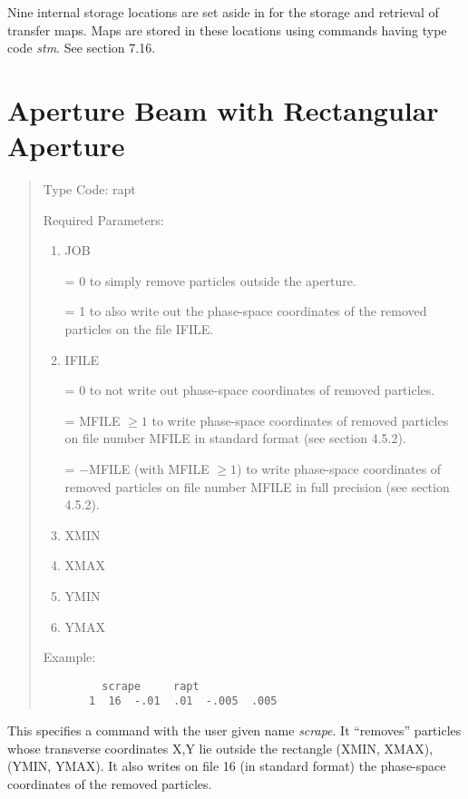 Nine internal storage locations are set aside in \Mary for the storage
and retrieval of transfer maps.  Maps are stored in these locations using
commands having type code {\em stm}.  See section 7.16.

\newpage
\section{Aperture Beam with Rectangular Aperture}
\begin{quotation}
\noindent Type Code:  rapt
\vspace{5mm}

\noindent Required Parameters:
\begin{enumerate}
\item JOB

             = 0 to simply remove particles outside the aperture.

             = 1 to also write out the phase-space coordinates of the removed particles  \hspace*{1em} on the file IFILE.

\item IFILE

             = 0 to not write out phase-space coordinates of removed particles.

             = MFILE $\geq 1$ to write phase-space coordinates of removed particles  on file \hspace*{1em}number MFILE in standard format (see section 4.5.2).

              = $-$MFILE (with MFILE $\geq 1$) to write phase-space coordinates of removed   \hspace*{1em} particles on file number MFILE in full precision (see section 4.5.2).

      \item  XMIN
      \item  XMAX
      \item  YMIN
      \item  YMAX
\end{enumerate}

\vspace{5mm}
\noindent Example:
\begin{verbatim}
         scrape     rapt
       1  16  -.01  .01  -.005  .005
\end{verbatim}
\end{quotation}
This specifies a command with the user given name {\em scrape}.  It
``removes'' particles whose transverse coordinates X,Y lie outside the
rectangle (XMIN, XMAX), (YMIN, YMAX).  It also writes on file 16 (in standard format) the phase-space coordinates of the removed particles.


